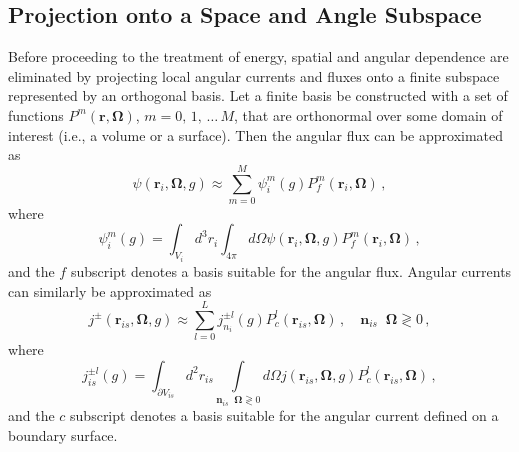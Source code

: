 \documentclass[5p,times,twocolumn,10pt]{elsarticle}
\DeclareMathOperator*{\dotp}{{\scriptscriptstyle \stackrel{\bullet}{{}}}}
\begin{document}
  \subsection{Projection onto a Space and Angle Subspace}
  
  Before proceeding to the treatment of energy, spatial and angular 
  dependence are eliminated by projecting local angular
  currents and fluxes onto a finite subspace 
  represented by an orthogonal basis.
  Let a finite basis be constructed with a set
  of functions 
  $P^m(\mathbf{r},\bm{\Omega})$, $m=0,\, 1,\, \ldots \, M$,
  that are orthonormal over some domain of 
  interest (i.e., a volume or a surface).  
  Then the angular flux can be approximated as
  \begin{equation}
    \psi(\mathbf{r}_i, \bm{\Omega}, g) 
    \approx \sum^M_{m=0} \psi_{i}^m(g) P^m_f(\mathbf{r}_i,\bm{\Omega}) \, ,
    \label{eq:qexpand}   
  \end{equation}
  where 
  \begin{equation}
    \psi_{i}^m(g) 
    = \int_{V_i}  d^3 r_i \int_{4\pi} d\Omega
    \psi(\mathbf{r}_i, \bm{\Omega}, g)  P^m_f(\mathbf{r}_i,\bm{\Omega}) \, ,
  \end{equation}
  and the $f$ subscript denotes a basis suitable for the
  angular flux.  Angular currents can similarly be approximated as 
  \begin{equation}
    j^{\pm}(\mathbf{r}_{is}, \bm{\Omega}, g) 
    \approx \sum^L_{l=0} j_{n_i}^{\pm l}(g) 
    P^l_c(\mathbf{r}_{is},\bm{\Omega}) \, , 
    \quad \mathbf{n}_{is} \dotp \bm{\Omega} \gtrless 0 \, ,
    \label{eq:jexpand}   
  \end{equation}
  where 
  \begin{equation}
    j_{is}^{\pm l}(g)
    =  \int_{\partial V_{is}} d^2 r_{is}
    \int\limits_{\mathbf{n}_{is} \dotp \bm{\Omega} \gtrless 0} d \Omega
    j(\mathbf{r}_{is}, \bm{\Omega},g)  P^l_c(\mathbf{r}_{is},\bm{\Omega}) \, ,
  \end{equation}
  and the $c$ subscript denotes a basis suitable for the angular current 
  defined on a boundary surface.
  
\end{document}
